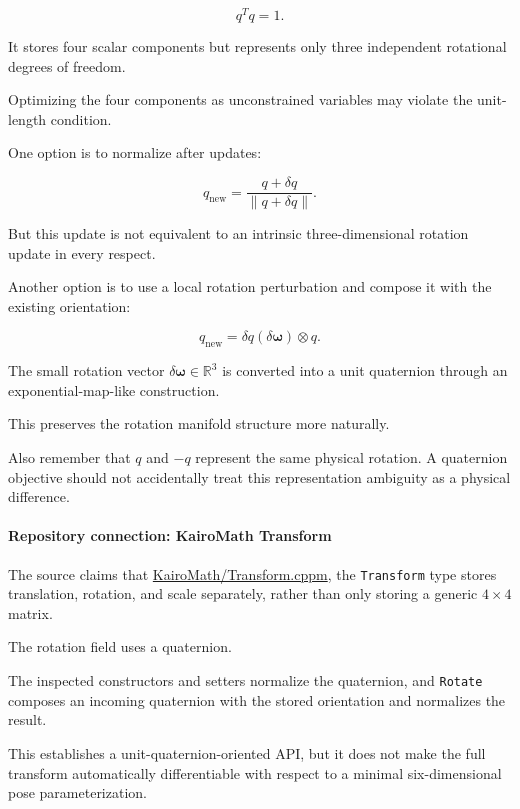 \[
q^Tq=1.
\]

It stores four scalar components but represents only three independent rotational degrees of freedom.

Optimizing the four components as unconstrained variables may violate the unit-length condition.

One option is to normalize after updates:

\[
q_{\mathrm{new}}= \frac{q+\delta q}{\|q+\delta q\|}.
\]

But this update is not equivalent to an intrinsic three-dimensional rotation update in every respect.

Another option is to use a local rotation perturbation and compose it with the existing orientation:

\[
q_{\mathrm{new}}= \delta q(\delta\boldsymbol\omega)\otimes q.
\]

The small rotation vector \(\delta\boldsymbol\omega\in\mathbb R^3\) is converted into a unit quaternion through an exponential-map-like construction.

This preserves the rotation manifold structure more naturally.

Also remember that \(q\) and \(-q\) represent the same physical rotation. A quaternion objective should not accidentally treat this representation ambiguity as a physical difference.

\paragraph{Repository connection: KairoMath Transform}\label{02-foundations-ii-ch027-repository-connection-kairomath-transform}

\hypertarget{02-foundations-ii-ch027-repository-connection-kairomath-transform}{}

The source claims that \href{https://github.com/swayam8624/KairoMath/blob/master/Transform.cppm?utm_source=chatgpt.com}{KairoMath/Transform.cppm}, the \texttt{Transform} type stores translation, rotation, and scale separately, rather than only storing a generic \(4\times4\) matrix.

The rotation field uses a quaternion.

The inspected constructors and setters normalize the quaternion, and \texttt{Rotate} composes an incoming quaternion with the stored orientation and normalizes the result.

This establishes a unit-quaternion-oriented API, but it does not make the full transform automatically differentiable with respect to a minimal six-dimensional pose parameterization.

